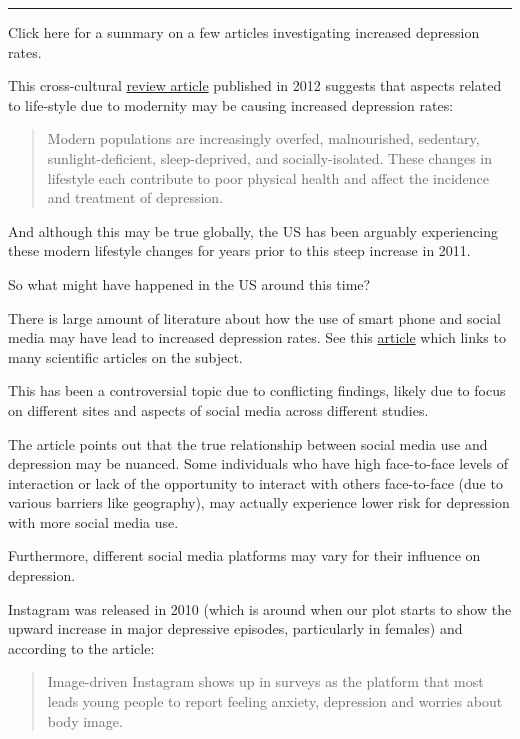 \documentclass[
]{article}
\begin{document}
\begin{center}\rule{0.5\linewidth}{0.5pt}\end{center}

Click here for a summary on a few articles investigating increased
depression rates.

This cross-cultural
\href{https://www.ncbi.nlm.nih.gov/pmc/articles/PMC3330161/}{review
article} published in 2012 suggests that aspects related to life-style
due to modernity may be causing increased depression rates:

\begin{quote}
Modern populations are increasingly overfed, malnourished, sedentary,
sunlight-deficient, sleep-deprived, and socially-isolated. These changes
in lifestyle each contribute to poor physical health and affect the
incidence and treatment of depression.
\end{quote}

And although this may be true globally, the US has been arguably
experiencing these modern lifestyle changes for years prior to this
steep increase in 2011.

So what might have happened in the US around this time?

There is large amount of literature about how the use of smart phone and
social media may have lead to increased depression rates. See this
\href{https://childmind.org/article/is-social-media-use-causing-depression/}{article}
which links to many scientific articles on the subject.

This has been a controversial topic due to conflicting findings, likely
due to focus on different sites and aspects of social media across
different studies.

The article points out that the true relationship between social media
use and depression may be nuanced. Some individuals who have high
face-to-face levels of interaction or lack of the opportunity to
interact with others face-to-face (due to various barriers like
geography), may actually experience lower risk for depression with more
social media use.

Furthermore, different social media platforms may vary for their
influence on depression.

Instagram was released in 2010 (which is around when our plot starts to
show the upward increase in major depressive episodes, particularly in
females) and according to the article:

\begin{quote}
Image-driven Instagram shows up in surveys as the platform that most
leads young people to report feeling anxiety, depression and worries
about body image.
\end{quote}
\end{document}

